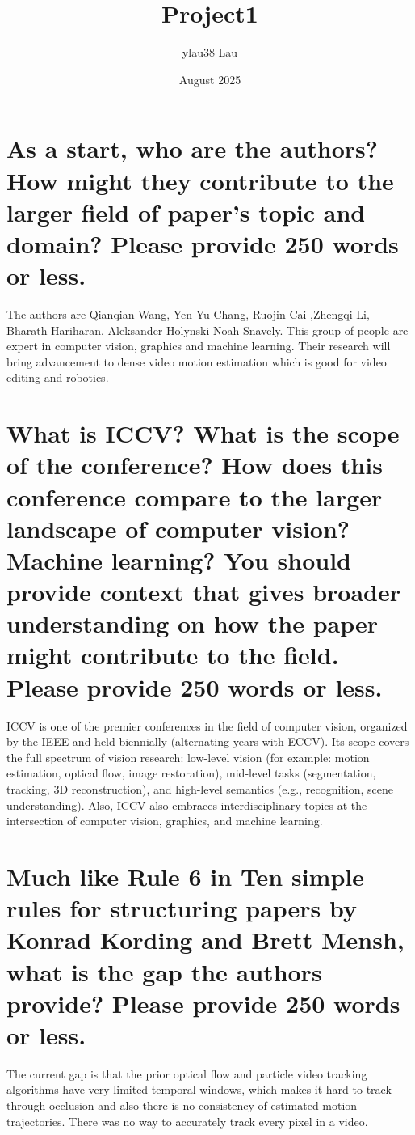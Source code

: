 \documentclass{article}
\title{Project1}
\author{ylau38 Lau}
\date{August 2025}
\begin{document}
\maketitle

\section{As a start, who are the authors? How might they contribute to the larger field of paper's topic and domain? Please provide 250 words or less.}

The authors are Qianqian Wang, Yen-Yu Chang, Ruojin Cai ,Zhengqi Li, Bharath Hariharan,
Aleksander Holynski Noah Snavely. This group of people are expert in computer vision, graphics and machine learning. Their research will bring advancement to dense video motion estimation which is good for video editing and robotics.


\section{What is ICCV? What is the scope of the conference? How does this conference compare to the larger landscape of computer vision? Machine learning? You should provide context that gives broader understanding on how the paper might contribute to the field. Please provide 250 words or less.}

ICCV is one of the premier conferences in the field of computer vision, organized by the IEEE and held biennially (alternating years with ECCV). Its scope covers the full spectrum of vision research: low-level vision (for example: motion estimation, optical flow, image restoration), mid-level tasks (segmentation, tracking, 3D reconstruction), and high-level semantics (e.g., recognition, scene understanding). Also, ICCV also embraces interdisciplinary topics at the intersection of computer vision, graphics, and machine learning.


\section{Much like Rule 6 in Ten simple rules for structuring papers by Konrad Kording and Brett Mensh, what is the gap the authors provide? Please provide 250 words or less.
}

The current gap is that the prior optical flow and particle video tracking algorithms have very limited temporal windows, which makes it hard to track through occlusion and also there is no consistency of estimated motion trajectories. There was no way to accurately track every pixel in a video.
\end{document}
